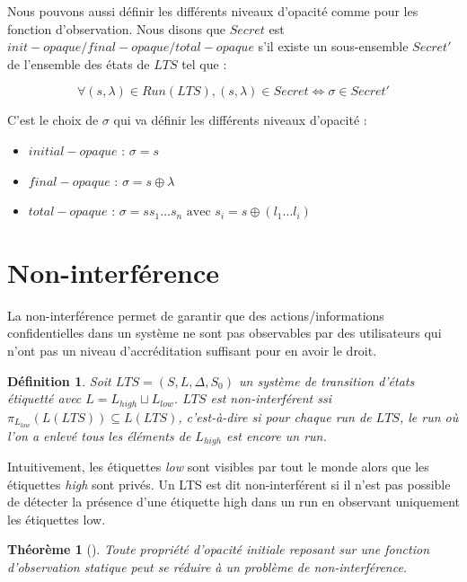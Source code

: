 \documentclass[10pt,a4paper]{article}
\newtheorem{mydef}{D\'efinition}
\newtheorem{myth}{Th\'eor\`eme}
\begin{document}
Nous pouvons aussi d\'efinir les diff\'erents niveaux d'opacit\'e comme pour les fonction d'observation. Nous disons que $Secret$ est $init-opaque/final-opaque/total-opaque$ s'il existe un sous-ensemble  $Secret'$ de l'ensemble des \'etats de $LTS$ tel que :

$$\forall (s,\lambda) \in Run(LTS), (s, \lambda) \in Secret \Leftrightarrow \sigma \in Secret'$$


C'est le choix de $\sigma$ qui va d\'efinir les diff\'erents niveaux d'opacit\'e :

\begin{itemize}
	\item $initial-opaque$ : $\sigma = s$
	\item $final-opaque$ : $\sigma = s\oplus \lambda$
	\item $total-opaque$ : $\sigma = s s_1 \dots s_n \mbox{ avec } s_i = s\oplus(l_1\dots l_i)$
\end{itemize} 

\section{Non-interf\'erence}

La non-interférence permet de garantir que des actions/informations  confidentielles dans un système ne sont pas observables par des utilisateurs qui n'ont pas un niveau d'accréditation suffisant pour en avoir le droit. 

\begin{mydef}
  Soit $LTS = (S,L,\Delta,S_0)$ un syst\`eme de transition d'\'etats \'etiquett\'e avec $L=L_{high}\sqcup L_{low}$. $LTS$ est non-interf\'erent ssi $\pi_{L_{low}}(L(LTS)) \subseteq L(LTS)$, c'est-\`a-dire si pour chaque run de $LTS$, le run o\`u l'on a enlev\'e tous les \'el\'ements de $L_{high}$ est encore un run.
\end{mydef}

Intuitivement, les étiquettes \emph{low} sont visibles par tout le monde alors que les étiquettes \emph{high} sont priv\'es. Un LTS est dit non-interf\'erent si il n'est pas possible de d\'etecter la pr\'esence d'une étiquette high dans un run en observant uniquement les étiquettes low.~\cite{GorrieriV10}

\begin{myth}[]
  Toute propri\'et\'e d'opacit\'e initiale reposant sur une fonction d'observation statique peut se r\'eduire \`a un probl\`eme  de non-interf\'erence.
  \label{opacity2noninterf}
\end{myth}
\end{document}
